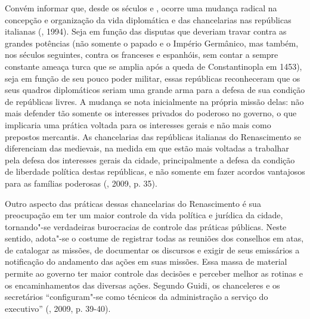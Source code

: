 Convém informar que, desde os séculos  e , ocorre uma mudança
radical na concepção e organização da vida diplomática e das
chancelarias nas repúblicas italianas (, 1994). Seja em função das
disputas que deveriam travar contra as grandes potências (não somente o
papado e o Império Germânico, mas também, nos séculos seguintes, contra
os franceses e espanhóis, sem contar a sempre constante ameaça turca que
se amplia após a queda de Constantinopla em 1453), seja em função de seu
pouco poder militar, essas repúblicas reconheceram que os seus quadros
diplomáticos seriam uma grande arma para a defesa de sua condição de
repúblicas livres. A mudança se nota inicialmente na própria missão
delas: não mais defender tão somente os interesses privados do poderoso
no governo, o que implicaria uma prática voltada para os interesses
gerais e não mais como prepostos mercantis. As chancelarias das
repúblicas italianas do Renascimento se diferenciam das medievais, na
medida em que estão mais voltadas a trabalhar pela defesa dos interesses
gerais da cidade, principalmente a defesa da condição de liberdade
política destas repúblicas, e não somente em fazer acordos vantajosos
para as famílias poderosas (, 2009, p. 35).

Outro aspecto das práticas dessas chancelarias do Renascimento é sua
preocupação em ter um maior controle da vida política e jurídica da
cidade, tornando"-se verdadeiras burocracias de controle das práticas
públicas. Neste sentido, adota"-se o costume de registrar todas as
reuniões dos conselhos em atas, de catalogar as missões, de documentar
os discursos e exigir de seus emissários a notificação do andamento das
ações em suas missões. Essa massa de material permite ao governo ter
maior controle das decisões e perceber melhor as rotinas e os
encaminhamentos das diversas ações. Segundo Guidi, os chanceleres e os
secretários ``configuram"-se como técnicos da administração a serviço do
executivo'' (, 2009, p. 39-40).

